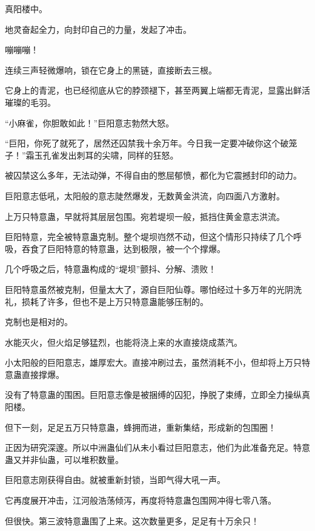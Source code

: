 
\begin{this_body}



真阳楼中。

地灵奋起全力，向封印自己的力量，发起了冲击。

嘣嘣嘣！

连续三声轻微爆响，锁在它身上的黑链，直接断去三根。

它身上的青泥，也已经彻底从它的脖颈褪下，甚至两翼上端都无青泥，显露出鲜活璀璨的毛羽。

“小麻雀，你胆敢如此！”巨阳意志勃然大怒。

“巨阳，你死了就死了，居然还囚禁我十余万年。今日我一定要冲破你这个破笼子！”霜玉孔雀发出刺耳的尖啸，同样的狂怒。

被囚禁这么多年，无法动弹，不得自由的憋屈郁愤，都化为它震撼封印的动力。

巨阳意志低吼，太阳般的意志陡然爆发，无数黄金洪流，向四面八方激射。

上万只特意蛊，早就将其层层包围。宛若堤坝一般，抵挡住黄金意志洪流。

巨阳特意，完全被特意蛊克制。整个堤坝岿然不动，但这个情形只持续了几个呼吸，吞食了巨阳特意的特意蛊，达到极限，被一个个撑爆。

几个呼吸之后，特意蛊构成的“堤坝”颤抖、分解、溃败！

巨阳特意虽然被克制，但量太大了，源自巨阳仙尊。哪怕经过十多万年的光阴洗礼，损耗了许多，但也不是上万只特意蛊能够压制的。

克制也是相对的。

水能灭火，但火焰足够猛烈，也能将浇上来的水直接烧成蒸汽。

小太阳般的巨阳意志，雄厚宏大。直接冲刷过去，虽然消耗不小，但却将上万只特意蛊直接撑爆。

没有了特意蛊的围困。巨阳意志像是被捆缚的囚犯，挣脱了束缚，立即全力操纵真阳楼。

但下一刻，足足五万只特意蛊，蜂拥而进，重新集结，形成新的包围圈！

正因为研究深邃。所以中洲蛊仙们从未小看过巨阳意志，他们为此准备充足。特意蛊又并非仙蛊，可以堆积数量。

巨阳意志刚获得自由。就被重新封锁，当即气得大吼一声。

它再度展开冲击，江河般浩荡倾泻，再度将特意蛊包围网冲得七零八落。

但很快。第三波特意蛊围了上来。这次数量更多，足足有十万余只！


\end{this_body}
